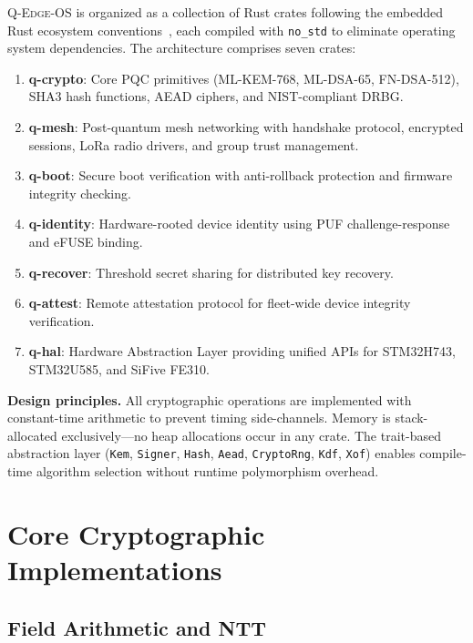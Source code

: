 \documentclass[conference,10pt]{IEEEtran}
\newcommand{\system}{\textsc{Q-Edge-OS}}
\begin{document}
\system{} is organized as a collection of Rust crates following the embedded Rust ecosystem conventions~\cite{rust_embedded}, each compiled with \texttt{no\_std} to eliminate operating system dependencies. The architecture comprises seven crates:

\begin{enumerate}[leftmargin=*]
  \item \textbf{q-crypto}: Core PQC primitives (ML-KEM-768, ML-DSA-65, FN-DSA-512), SHA3 hash functions, AEAD ciphers, and NIST-compliant DRBG.
  \item \textbf{q-mesh}: Post-quantum mesh networking with handshake protocol, encrypted sessions, LoRa radio drivers, and group trust management.
  \item \textbf{q-boot}: Secure boot verification with anti-rollback protection and firmware integrity checking.
  \item \textbf{q-identity}: Hardware-rooted device identity using PUF challenge-response and eFUSE binding.
  \item \textbf{q-recover}: Threshold secret sharing for distributed key recovery.
  \item \textbf{q-attest}: Remote attestation protocol for fleet-wide device integrity verification.
  \item \textbf{q-hal}: Hardware Abstraction Layer providing unified APIs for STM32H743, STM32U585, and SiFive FE310.
\end{enumerate}

\textbf{Design principles.} All cryptographic operations are implemented with constant-time arithmetic to prevent timing side-channels. Memory is stack-allocated exclusively---no heap allocations occur in any crate. The trait-based abstraction layer (\texttt{Kem}, \texttt{Signer}, \texttt{Hash}, \texttt{Aead}, \texttt{CryptoRng}, \texttt{Kdf}, \texttt{Xof}) enables compile-time algorithm selection without runtime polymorphism overhead.

\section{Core Cryptographic Implementations}
\label{sec:crypto}

\subsection{Field Arithmetic and NTT}
\end{document}
